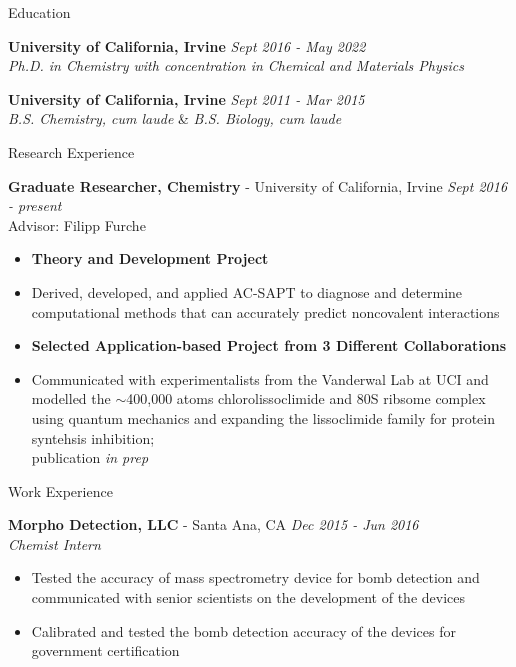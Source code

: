 \documentclass{resume} %
\begin{document}
{\centerline { } }
\vspace{-0.3in}

\begin{rSection}{Education}

{\bf University of California, Irvine} \hfill {\em Sept 2016 - May 2022} 
\\{\textit{Ph.D. in Chemistry with concentration in Chemical and Materials Physics}}

{\bf University of California, Irvine} \hfill {\em Sept 2011 - Mar 2015} 
\\ { \textit{B.S. Chemistry, cum laude}} \& {\textit{B.S. Biology, cum laude}} \hfill

\end{rSection}

\begin{rSection}{Research Experience}

\textbf{Graduate Researcher, Chemistry} - University of California, Irvine \hfill {\em Sept 2016 - present}\\
Advisor: Filipp Furche
\vspace{-0.5em}
\begin{itemize}    
\itemsep-0.65em
\item[] \textbf{Theory and Development Project}
\item Derived, developed, and applied AC-SAPT to diagnose and determine computational methods that
  can accurately predict noncovalent interactions
\item[] \textbf{Selected Application-based Project from 3 Different Collaborations}
\item Communicated with experimentalists from the Vanderwal Lab at UCI and modelled
  the $\sim$400,000 atoms chlorolissoclimide and 80S ribsome complex
  using quantum mechanics and expanding the lissoclimide family for protein syntehsis inhibition; \\
  publication \textit{in prep}
\end{itemize}

\end{rSection}

\begin{rSection}{Work Experience}
  
  {\bf Morpho Detection, LLC} - Santa Ana, CA \hfill {\em Dec 2015 - Jun 2016}  \\
  {\textit{Chemist Intern}}
  \vspace{-0.5em}
  \begin{itemize}
  \itemsep-0.75em
  \item Tested the accuracy of mass spectrometry device for bomb detection and communicated
    with senior scientists on the development of the devices
  \item Calibrated and tested the bomb detection accuracy of the devices for
    government certification
  \end{itemize}  

\end{rSection}
\end{document}
